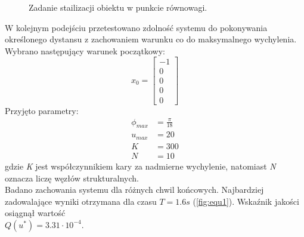 \begin{figure}[!t]
	\caption{Zadanie stailizacji obiektu w punkcie równowagi.}
	\label{fig:equ}
\end{figure}
\newpage
W kolejnym podejściu przetestowano zdolność systemu do pokonywania określonego dystansu z zachowaniem warunku co do maksymalnego wychylenia. Wybrano następujący warunek początkowy:
\begin{equation}
x_0=\begin{bmatrix}
-1\\
0\\
0\\
0\\
0
\end{bmatrix}
\end{equation}
Przyjęto parametry:
\begin{equation}
\begin{aligned}
\phi_{max}&=\frac{\pi}{18}\\
u_{max}&=20\\
K&=300\\
N&=10
\end{aligned}
\end{equation}
gdzie \textit{K} jest współczynnikiem kary za nadmierne wychylenie, natomiast \textit{N} oznacza liczę węzłów strukturalnych.\\
Badano zachowania systemu dla różnych chwil końcowych. Najbardziej zadowalające wyniki otrzymana dla czasu $\textit{T}=1.6 s$ (\ref{fig:equ1}). Wskaźnik jakości osiągnął wartość\\ $Q(u^*)=3.31\cdot10^{-4}$.

